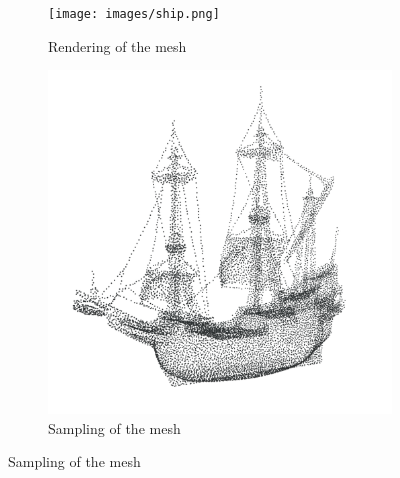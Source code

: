 \documentclass[oneside, a4paper]{book}
\begin{document}
    \begin{figure}
      \centering
      \begin{subfigure}[t][0.5\textwidth]{0.5\textwidth}
        \texttt{[image: images/ship.png]}
        \caption{Rendering of the mesh}
        \label{fig:ship-sample-a}
      \end{subfigure}%
      \begin{subfigure}[t][0.5\textwidth]{0.5\textwidth}
        \includegraphics[width=\textwidth]{images/ship_sample_inv.png}
        \caption{Sampling of the mesh}
        \label{fig:ship-sample-b}
      \end{subfigure}\vspace{1cm}




\end{figure}
\end{document}
